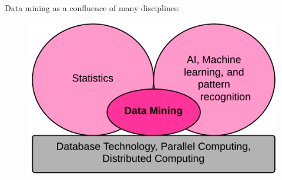 	Data mining as a confluence of many disciplines:

	\begin{figure}[H]
		\includegraphics[scale=0.3]{pics/disciplinesDataMining.png}
	\end{figure}



	

